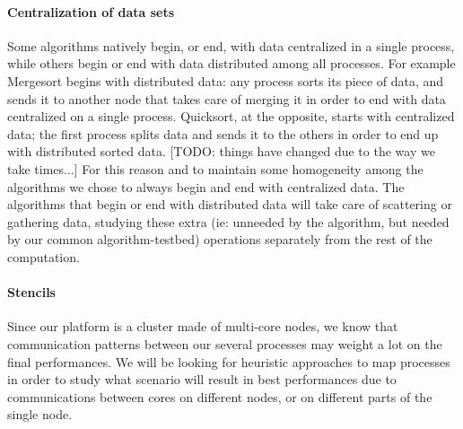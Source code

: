 \paragraph{Centralization of data sets} Some algorithms natively begin, or end, with data centralized in a single process, while others begin or end with data distributed among all processes. For example Mergesort begins with distributed data: any process sorts its piece of data, and sends it to another node that takes care of merging it in order to end with data centralized on a single process. Quicksort, at the opposite, starts with centralized data; the first process splits data and sends it to the others in order to end up with distributed sorted data. [TODO: things have changed due to the way we take times...] For this reason and to maintain some homogeneity among the algorithms we chose to always begin and end with centralized data. The algorithms that begin or end with distributed data will take care of scattering or gathering data, studying these extra (ie: unneeded by the algorithm, but needed by our common algorithm-testbed) operations separately from the rest of the computation.

\paragraph{Stencils} Since our platform is a cluster made of multi-core nodes, we know that communication patterns between our several processes may weight a lot on the final performances. We will be looking for heuristic approaches to map processes in order to study what scenario will result in best performances due to communications between cores on different nodes, or on different parts of the single node.

